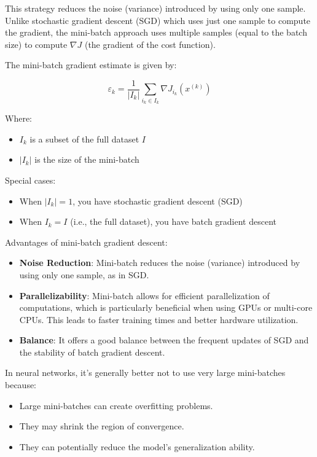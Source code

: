 This strategy reduces the noise (variance) introduced by using only one sample.
Unlike stochastic gradient descent (SGD) which uses just one sample to compute the gradient, the mini-batch approach uses multiple samples (equal to the batch size) to compute $\nabla J$ (the gradient of the cost function).

The mini-batch gradient estimate is given by:

\begin{equation}
    \varepsilon_{k} = \frac{1}{|I_{k}|} \sum_{i_{k} \in I_{k}} \nabla J_{i_{k}}(x^{(k)})
\end{equation}

Where:
\begin{itemize}
    \item $I_{k}$ is a subset of the full dataset $I$
    \item $|I_{k}|$ is the size of the mini-batch
\end{itemize}

Special cases:
\begin{itemize}
    \item When $|I_{k}| = 1$, you have stochastic gradient descent (SGD)
    \item When $I_{k} = I$ (i.e., the full dataset), you have batch gradient descent
\end{itemize}

Advantages of mini-batch gradient descent:
\begin{itemize}
    \item \textbf{Noise Reduction}: Mini-batch reduces the noise (variance) introduced by using only one sample, as in SGD.
    \item \textbf{Parallelizability}: Mini-batch allows for efficient parallelization of computations, which is particularly beneficial when using GPUs or multi-core CPUs. This leads to faster training times and better hardware utilization.
    \item \textbf{Balance}: It offers a good balance between the frequent updates of SGD and the stability of batch gradient descent.
\end{itemize}

In neural networks, it's generally better not to use very large mini-batches because:
\begin{itemize}
    \item Large mini-batches can create overfitting problems.
    \item They may shrink the region of convergence.
    \item They can potentially reduce the model's generalization ability.
\end{itemize}

